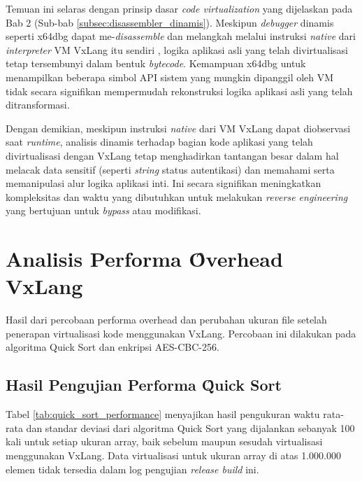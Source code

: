 Temuan ini selaras dengan prinsip dasar \textit{code virtualization} yang dijelaskan pada Bab 2 (Sub-bab \ref{subsec:disassembler_dinamis}). Meskipun \textit{debugger} dinamis seperti x64dbg dapat me-\textit{disassemble} dan melangkah melalui instruksi \textit{native} dari \textit{interpreter} VM VxLang itu sendiri \cite{Sikorski2012}, logika aplikasi asli yang telah divirtualisasi tetap tersembunyi dalam bentuk \textit{bytecode}. Kemampuan x64dbg untuk menampilkan beberapa simbol API sistem yang mungkin dipanggil oleh VM tidak secara signifikan mempermudah rekonstruksi logika aplikasi asli yang telah ditransformasi.

Dengan demikian, meskipun instruksi \textit{native} dari VM VxLang dapat diobservasi saat \textit{runtime}, analisis dinamis terhadap bagian kode aplikasi yang telah divirtualisasi dengan VxLang tetap menghadirkan tantangan besar dalam hal melacak data sensitif (seperti \textit{string} status autentikasi) dan memahami serta memanipulasi alur logika aplikasi inti. Ini secara signifikan meningkatkan kompleksitas dan waktu yang dibutuhkan untuk melakukan \textit{reverse engineering} yang bertujuan untuk \textit{bypass} atau modifikasi.

\section{Analisis Performa \f{Overhead} VxLang}
Hasil dari percobaan performa overhead dan perubahan ukuran file setelah penerapan virtualisasi kode menggunakan VxLang. Percobaan ini dilakukan pada algoritma Quick Sort dan enkripsi AES-CBC-256.

\subsection{Hasil Pengujian Performa \f{Quick Sort}}
Tabel \ref{tab:quick_sort_performance} menyajikan hasil pengukuran waktu rata-rata dan standar deviasi dari algoritma Quick Sort yang dijalankan sebanyak 100 kali untuk setiap ukuran array, baik sebelum maupun sesudah virtualisasi menggunakan VxLang. Data virtualisasi untuk ukuran array di atas 1.000.000 elemen tidak tersedia dalam log pengujian \textit{release build} ini.

